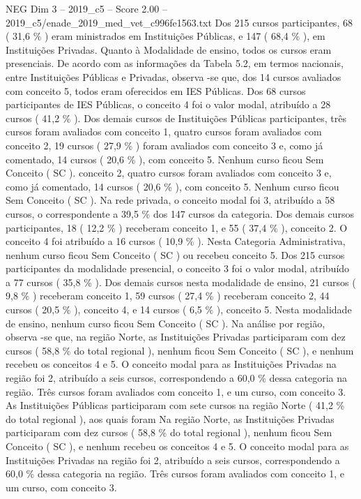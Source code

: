 \begin{textsample}{NEG Dim 3 – 2019\_c5 – Score 2.00 – 2019\_c5/enade\_2019\_med\_vet\_c996fe1563.txt}
Dos 215 cursos participantes, 68 ( 31,6 \% ) eram ministrados em Instituições Públicas, e 147 ( 68,4 \% ), em Instituições Privadas.
Quanto à Modalidade de ensino, todos os cursos eram presenciais.
De acordo com as informações da Tabela 5.2, em termos nacionais, entre Instituições Públicas e Privadas, observa -se que, dos 14 cursos avaliados com conceito 5, todos eram oferecidos em IES Públicas.
Dos 68 cursos participantes de IES Públicas, o conceito 4 foi o valor modal, atribuído a 28 cursos ( 41,2 \% ).
Dos demais cursos de Instituições Públicas participantes, três cursos foram avaliados com conceito 1, quatro cursos foram avaliados com conceito 2, 19 cursos ( 27,9 \% ) foram avaliados com conceito 3 e, como já comentado, 14 cursos ( 20,6 \% ), com conceito 5.
Nenhum curso ficou Sem Conceito ( SC ). conceito 2, quatro cursos foram avaliados com conceito 3 e, como já comentado, 14 cursos ( 20,6 \% ), com conceito 5.
Nenhum curso ficou Sem Conceito ( SC ).
Na rede privada, o conceito modal foi 3, atribuído a 58 cursos, o correspondente a 39,5 \% dos 147 cursos da categoria.
Dos demais cursos participantes, 18 ( 12,2 \% ) receberam conceito 1, e 55 ( 37,4 \% ), conceito 2.
O conceito 4 foi atribuído a 16 cursos ( 10,9 \% ).
Nesta Categoria Administrativa, nenhum curso ficou Sem Conceito ( SC ) ou recebeu conceito 5.
Dos 215 cursos participantes da modalidade presencial, o conceito 3 foi o valor modal, atribuído a 77 cursos ( 35,8 \% ).
Dos demais cursos nesta modalidade de ensino, 21 cursos ( 9,8 \% ) receberam conceito 1, 59 cursos ( 27,4 \% ) receberam conceito 2, 44 cursos ( 20,5 \% ), conceito 4, e 14 cursos ( 6,5 \% ), conceito 5.
Nesta modalidade de ensino, nenhum curso ficou Sem Conceito ( SC ).
Na análise por região, observa -se que, na região Norte, as Instituições Privadas participaram com dez cursos ( 58,8 \% do total regional ), nenhum ficou Sem Conceito ( SC ), e nenhum recebeu os conceitos 4 e 5.
O conceito modal para as Instituições Privadas na região foi 2, atribuído a seis cursos, correspondendo a 60,0 \% dessa categoria na região.
Três cursos foram avaliados com conceito 1, e um curso, com conceito 3.
As Instituições Públicas participaram com sete cursos na região Norte ( 41,2 \% do total regional ), aos quais foram Na região Norte, as Instituições Privadas participaram com dez cursos ( 58,8 \% do total regional ), nenhum ficou Sem Conceito ( SC ), e nenhum recebeu os conceitos 4 e 5.
O conceito modal para as Instituições Privadas na região foi 2, atribuído a seis cursos, correspondendo a 60,0 \% dessa categoria na região.
Três cursos foram avaliados com conceito 1, e um curso, com conceito 3.

\end{textsample}
